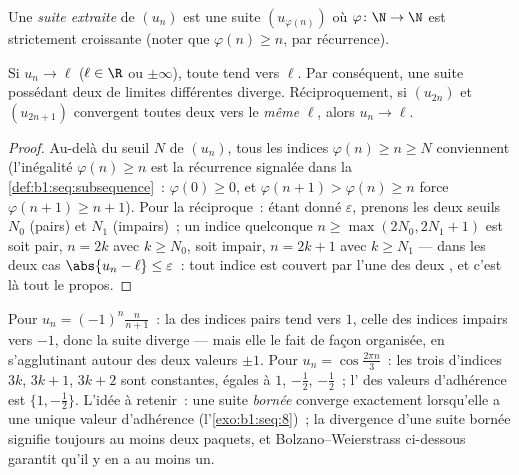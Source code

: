\begin{definition}\label{def:b1:seq:subsequence}
Une \emph{suite extraite} de $(u_n)$ est une
suite $(u_{\varphi(n)})$ où $\varphi \colon \N \to \N$ est
strictement croissante (noter que $\varphi(n) \geq n$, par
récurrence).
\end{definition}

\begin{proposition}\label{prop:b1:seq:subsequences}
Si $u_n \to \ell$ ($\ell \in \R$ ou $\pm\infty$), toute 
tend vers $\ell$. Par conséquent, une suite possédant deux  de limites différentes diverge. Réciproquement, si
$(u_{2n})$ et $(u_{2n+1})$ convergent toutes deux vers le
\emph{même} $\ell$, alors $u_n \to \ell$.
\end{proposition}

\begin{proof}
Au-delà du seuil $N$ de $(u_n)$, tous les indices $\varphi(n) \geq n
\geq N$ conviennent (l'inégalité $\varphi(n) \geq n$ est la
récurrence signalée dans la \cref{def:b1:seq:subsequence}~:
$\varphi(0) \geq 0$, et $\varphi(n+1) > \varphi(n) \geq n$ force
$\varphi(n+1) \geq n + 1$). Pour la réciproque~: étant donné
$\varepsilon$, prenons les deux seuils $N_0$ (pairs) et $N_1$
(impairs)~; un indice quelconque $n \geq \max(2N_0, 2N_1 + 1)$ est
soit pair, $n = 2k$ avec $k \geq N_0$, soit impair, $n = 2k+1$ avec
$k \geq N_1$ --- dans les deux cas $\abs{u_n - \ell} \leq
\varepsilon$~: tout indice est couvert par l'une des deux , et c'est là tout le propos.
\end{proof}

\begin{example}\label{ex:b1:seq:sublimits}
Pour $u_n = (-1)^n \frac{n}{n+1}$~: la  des indices
pairs tend vers $1$, celle des indices impairs vers $-1$, donc la
suite diverge --- mais elle le fait de façon organisée, en
s'agglutinant autour des deux valeurs $\pm 1$. Pour $u_n =
\cos\frac{2\pi n}{3}$~: les trois  d'indices $3k$, $3k
+ 1$, $3k + 2$ sont constantes, égales à $1$, $-\frac12$,
$-\frac12$~; l' des valeurs d'adhérence est $\{1,
-\frac12\}$. L'idée à retenir~: une suite \emph{bornée} converge
exactement lorsqu'elle a une unique valeur d'adhérence
(l'\cref{exo:b1:seq:8})~; la divergence d'une suite bornée signifie
toujours au moins deux paquets, et Bolzano--Weierstrass ci-dessous
garantit qu'il y en a au moins un.
\end{example}


